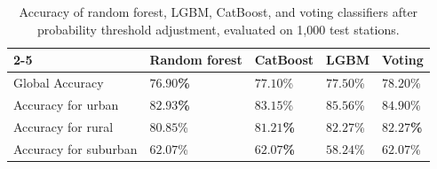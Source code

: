 \documentclass[gmd, manuscript]{copernicus}
\begin{document}
\begin{table}[htb!]
\centering
\caption{Accuracy of random forest, LGBM, CatBoost, and voting classifiers after probability threshold adjustment, evaluated on 1,000 test stations.}
\begin{tabular}{l|l|l|l|l|}
\cline{2-5} & \textbf{Random forest} & \textbf{CatBoost} & \textbf{LGBM} & \textbf{Voting} \\ \hline
\multicolumn{1}{|l|}{Global Accuracy} & \textbf{$76.90$\%}  & $77.10$\%  & $77.50$\%  & $78.20$\%  \\ \hline
\multicolumn{1}{|l|}{Accuracy for urban}    & \textbf{$82.93$\%}      & $83.15$\%  & $85.56$\% & $84.90$\%   \\ \hline
\multicolumn{1}{|l|}{Accuracy for rural}    & $80.85$\%   & \textbf{$81.21$\%}   & $82.27$\% & \textbf{$82.27$\%} \\ \hline
\multicolumn{1}{|l|}{Accuracy for suburban} & $62.07$\%   & \textbf{$62.07$\%}   & $58.24$\% & $62.07$\%   \\ \hline
\end{tabular}
\label{supervized_results_after_prob_adj}
\end{table}
\end{document}
